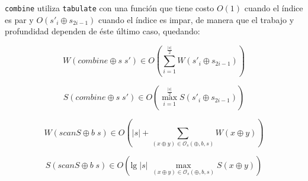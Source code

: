 \documentclass[a4paper,10pt]{article}
\begin{document}
\texttt{combine} utiliza \texttt{tabulate} con una función que tiene costo $O \left( 1 \right)$
cuando el índice es par y $O \left( s'_{i} \oplus s_{2i-1} \right)$ cuando el índice 
es impar, de manera que el trabajo y profundidad dependen de éste último caso,
quedando:

\begin{equation*}
    W \left( combine \oplus s \; s' \right) \in
    O \left( \sum_{i=1}^{\frac{\vert s \vert}{2}} W \left( s'_{i} \oplus s_{2i-1} \right) \right)
\end{equation*}

\begin{equation*}
    S \left( combine \oplus s \; s' \right) \in
    O \left( \max_{i=1}^{\frac{\vert s \vert}{2}} S \left( s'_{i} \oplus s_{2i-1} \right) \right)
\end{equation*}

\begin{equation*}
    W \left( scanS \oplus b \; s \right) \in
    O \left( \vert s \vert + \sum_{(x \oplus y) \in \mathcal{O}_s(\oplus,b,s)} W \left( x \oplus y \right) \right)
\end{equation*}

\begin{equation*}
    S \left( scanS \oplus b \; s \right) \in
    O \left( \text{lg} \; \vert s \vert \; \max_{(x \oplus y) \in \mathcal{O}_s(\oplus,b,s)} S \left( x \oplus y \right) \right)
\end{equation*}
\end{document}
